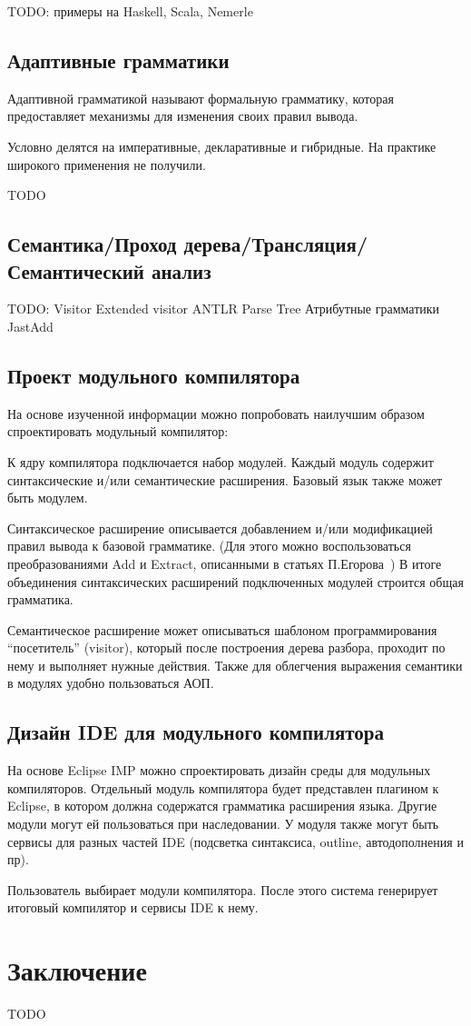 \documentclass[a4paper,12pt]{article}
\begin{document}
TODO: примеры на Haskell, Scala, Nemerle

\subsection{Адаптивные грамматики}
\label{adaptive}
Адаптивной грамматикой называют формальную грамматику, которая предоставляет
механизмы для изменения своих правил вывода.

Условно делятся на императивные, декларативные и гибридные. На практике
широкого применения не получили.

TODO

\subsection{Семантика/Проход дерева/Трансляция/Семантический анализ}
TODO:
 Visitor
  Extended visitor
 ANTLR Parse Tree
 Атрибутные грамматики
  JastAdd

\subsection{Проект модульного компилятора}
На основе изученной информации можно попробовать наилучшим образом
спроектировать модульный компилятор:

К ядру компилятора подключается набор модулей. Каждый модуль содержит
синтаксические и/или семантические расширения. Базовый язык также может быть
модулем.

Синтаксическое расширение описывается добавлением и/или модификацией правил
вывода к базовой грамматике. (Для этого можно воспользоваться преобразованиями
Add и Extract, описанными в статьях П.Егорова~\cite{Egor}) В итоге объединения
синтаксических расширений подключенных модулей строится общая грамматика.

Семантическое расширение может описываться шаблоном программирования
``посетитель'' (visitor), который после построения дерева разбора, проходит по
нему и выполняет нужные действия. Также для облегчения выражения семантики в
модулях удобно пользоваться АОП.

\subsection{Дизайн IDE для модульного компилятора}

На основе Eclipse IMP можно спроектировать дизайн среды для модульных
компиляторов.
Отдельный модуль компилятора будет представлен плагином к Eclipse, в котором
должна содержатся грамматика расширения языка. Другие модули могут ей
пользоваться при наследовании. У модуля также могут быть сервисы для разных
частей IDE (подсветка синтаксиса, outline, автодополнения и пр).

Пользователь выбирает модули компилятора. После этого система генерирует
итоговый компилятор и сервисы IDE к нему.

\section{Заключение}

TODO

\small



\end{document}
